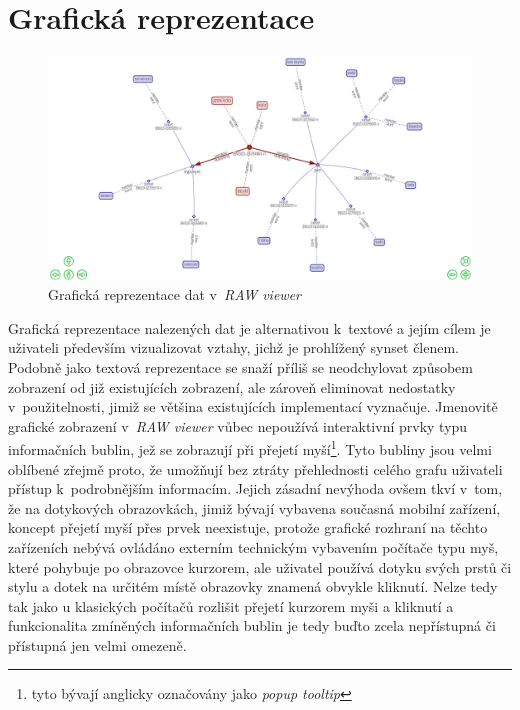 \documentclass[a4paper, 11pt, oneside, showtrims]{book}
\newcommand{\simplywn}{\textit{RAW viewer} }
\begin{document}
			\section{Grafická reprezentace}
			\label{cha:graphui}

				\begin{figure}[h]
					\centering
					\includegraphics[width=1.0\textwidth]{simplywn_graph.png}
					\caption{Grafická reprezentace dat v~\simplywn}
					\label{fig:simplywn_graph}
				\end{figure}

				Grafická reprezentace nalezených dat je alternativou k~textové a jejím cílem je uživateli především vizualizovat vztahy, jichž je prohlížený synset členem. Podobně jako textová reprezentace se snaží příliš se neodchylovat způsobem zobrazení od již existujících zobrazení, ale zároveň eliminovat nedostatky v~použitelnosti, jimiž se většina existujících implementací vyznačuje. Jmenovitě grafické zobrazení v~\simplywn vůbec nepoužívá interaktivní prvky typu informačních bublin, jež se zobrazují při přejetí myší\footnote{tyto bývají anglicky označovány jako \textit{popup tooltip}}. Tyto bubliny jsou velmi oblíbené zřejmě proto, že umožňují bez ztráty přehlednosti celého grafu uživateli přístup k~podrobnějším informacím. Jejich zásadní nevýhoda ovšem tkví v~tom, že na dotykových obrazovkách, jimiž bývají vybavena současná mobilní zařízení, koncept přejetí myší přes prvek neexistuje, protože grafické rozhraní na těchto zařízeních nebývá ovládáno externím technickým vybavením počítače typu myš, které pohybuje po obrazovce kurzorem, ale uživatel používá dotyku svých prstů či stylu a dotek na určitém místě obrazovky znamená obvykle kliknutí. Nelze tedy tak jako u klasických počítačů rozlišit přejetí kurzorem myši a kliknutí a funkcionalita zmíněných informačních bublin je tedy buďto zcela nepřístupná či přístupná jen velmi omezeně. 
\end{document}
